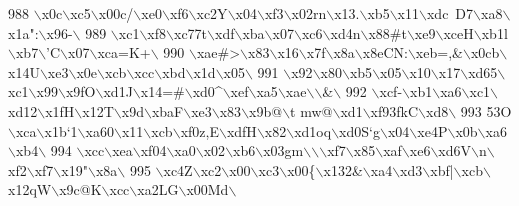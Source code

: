 \begin{DoxyCode}
988 \textcolor{stringliteral}{\(\backslash\)x0c\(\backslash\)xc5\(\backslash\)x00c/\(\backslash\)xe0\(\backslash\)xf6\(\backslash\)xc2Y\(\backslash\)x04\(\backslash\)xf3\(\backslash\)x02rn\(\backslash\)x13.\(\backslash\)xb5\(\backslash\)x11\(\backslash\)xdc~D7\(\backslash\)xa8\(\backslash\)x1a":\(\backslash\)x96-\(\backslash\)}
989 \textcolor{stringliteral}{\(\backslash\)xc1\(\backslash\)xf8\(\backslash\)xc77t\(\backslash\)xdf\(\backslash\)xba\(\backslash\)x07\(\backslash\)xc6\(\backslash\)xd4n\(\backslash\)x88#t\(\backslash\)xe9\(\backslash\)xceH\(\backslash\)xb1l\(\backslash\)xb7\(\backslash\)'C\(\backslash\)x07\(\backslash\)xca=K+\(\backslash\)}
990 \textcolor{stringliteral}{\(\backslash\)xae#>\(\backslash\)x83\(\backslash\)x16\(\backslash\)x7f\(\backslash\)x8a\(\backslash\)x8eCN:\(\backslash\)xeb=,&\(\backslash\)x0cb\(\backslash\)x14U\(\backslash\)xe3\(\backslash\)x0e\(\backslash\)xcb\(\backslash\)xcc\(\backslash\)xbd\(\backslash\)x1d\(\backslash\)x05\(\backslash\)}
991 \textcolor{stringliteral}{\(\backslash\)x92\(\backslash\)x80\(\backslash\)xb5\(\backslash\)x05\(\backslash\)x10\(\backslash\)x17\(\backslash\)xd65\(\backslash\)xc1\(\backslash\)x99\(\backslash\)x9fO\(\backslash\)xd1J\(\backslash\)x14=#\(\backslash\)xd0^\(\backslash\)xef\(\backslash\)xa5\(\backslash\)xae\(\backslash\)\(\backslash\)&\(\backslash\)}
992 \textcolor{stringliteral}{\(\backslash\)xcf-\(\backslash\)xb1\(\backslash\)xa6\(\backslash\)xc1\(\backslash\)xd12\(\backslash\)x1fH\(\backslash\)x12T\(\backslash\)x9d\(\backslash\)xbaF\(\backslash\)xe3\(\backslash\)x83\(\backslash\)x9b@\(\backslash\)t mw@\(\backslash\)xd1\(\backslash\)xf93fkC\(\backslash\)xd8\(\backslash\)}
993 \textcolor{stringliteral}{53O\(\backslash\)xca\(\backslash\)x1b`1\(\backslash\)xa60\(\backslash\)x11\(\backslash\)xcb\(\backslash\)xf0z,E\(\backslash\)xdfH\(\backslash\)x82\(\backslash\)xd1oq\(\backslash\)xd0S`g\(\backslash\)x04\(\backslash\)xe4P\(\backslash\)x0b\(\backslash\)xa6\(\backslash\)xb4\(\backslash\)}
994 \textcolor{stringliteral}{\(\backslash\)xcc\(\backslash\)xea\(\backslash\)xf04\(\backslash\)xa0\(\backslash\)x02\(\backslash\)xb6\(\backslash\)x03gm\(\backslash\)\(\backslash\)\(\backslash\)xf7\(\backslash\)x85\(\backslash\)xaf\(\backslash\)xe6\(\backslash\)xd6V\(\backslash\)n\(\backslash\)xf2\(\backslash\)xf7\(\backslash\)x19"\(\backslash\)x8a\(\backslash\)}
995 \textcolor{stringliteral}{\(\backslash\)xc4Z\(\backslash\)xc2\(\backslash\)x00\(\backslash\)xc3\(\backslash\)x00\{\(\backslash\)x132&\(\backslash\)xa4\(\backslash\)xd3\(\backslash\)xbf|\(\backslash\)xcb\(\backslash\)x12qW\(\backslash\)x9c@K\(\backslash\)xcc\(\backslash\)xa2LG\(\backslash\)x00Md\(\backslash\)}

\end{DoxyCode}
